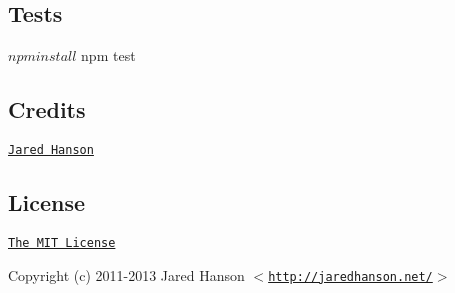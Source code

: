 \subsection*{Tests}

\begin{DoxyVerb}$ npm install
$ npm test
\end{DoxyVerb}


\subsection*{Credits}


\begin{DoxyItemize}
\item \href{http://github.com/jaredhanson}{\tt Jared Hanson}
\end{DoxyItemize}

\subsection*{License}

\href{http://opensource.org/licenses/MIT}{\tt The M\+IT License}

Copyright (c) 2011-\/2013 Jared Hanson $<$\href{http://jaredhanson.net/}{\tt http\+://jaredhanson.\+net/}$>$ 